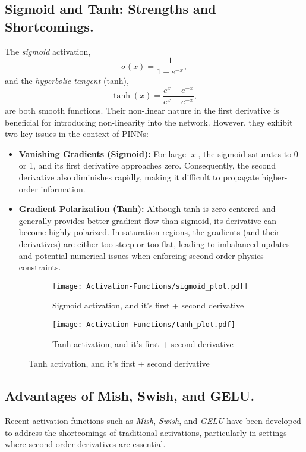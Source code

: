 \subsection{Sigmoid and Tanh: Strengths and Shortcomings.}
The \emph{sigmoid} activation,
\[
\sigma(x) = \frac{1}{1+e^{-x}},
\]
and the \emph{hyperbolic tangent} (tanh),
\[
\tanh(x) = \frac{e^x - e^{-x}}{e^x + e^{-x}},
\]
are both smooth functions. Their non-linear nature in the first derivative is beneficial for introducing non-linearity into the network. However, they exhibit two key issues in the context of PINNs:
\begin{itemize}
    \item \textbf{Vanishing Gradients (Sigmoid):} For large \(|x|\), the sigmoid saturates to 0 or 1, and its first derivative approaches zero. Consequently, the second derivative also diminishes rapidly, making it difficult to propagate higher-order information.
    \item \textbf{Gradient Polarization (Tanh):} Although tanh is zero-centered and generally provides better gradient flow than sigmoid, its derivative can become highly polarized. In saturation regions, the gradients (and their derivatives) are either too steep or too flat, leading to imbalanced updates and potential numerical issues when enforcing second-order physics constraints.
\end{itemize}
\begin{figure}[H]
    \centering
    \begin{subfigure}[t]{0.49\textwidth}
        \centering
        \texttt{[image: Activation-Functions/sigmoid\_plot.pdf]}
        \label{fig:Sigmoid}
        \caption{Sigmoid activation, and it's first + second derivative}
    \end{subfigure}
    \hfill
    \begin{subfigure}[t]{0.49\textwidth}
        \centering
        \texttt{[image: Activation-Functions/tanh\_plot.pdf]}
        \label{fig:Tanh}
        \caption{Tanh activation, and it's first + second derivative}
    \end{subfigure}
\end{figure}
\subsection{Advantages of Mish, Swish, and GELU.}
Recent activation functions such as \emph{Mish}, \emph{Swish}, and \emph{GELU} have been developed to address the shortcomings of traditional activations, particularly in settings where second-order derivatives are essential.

